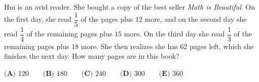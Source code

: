 Hui is an avid reader. She bought a copy of the best seller \emph{Math is Beautiful}. On the first day, she read $\dfrac15$ of the pages plus $12$ more, and on the second day she read $\dfrac14$ of the remaining pages plus $15$ more. On the third day she read $\dfrac13$ of the remaining pages plus $18$ more. She then realizes she has $62$ pages left, which she finishes the next day. How many pages are in this book?

$\textbf{(A) }120\qquad\textbf{(B) }180\qquad\textbf{(C) }240\qquad\textbf{(D) }300\qquad\textbf{(E) }360$
